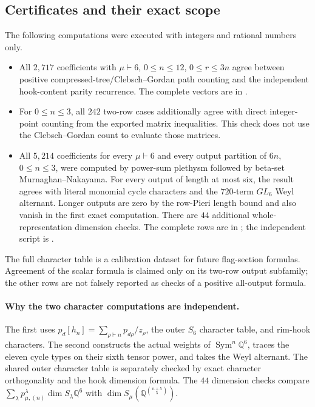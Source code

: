 \subsection{Certificates and their exact scope}
The following computations were executed with integers and
rational numbers only.
\begin{itemize}
\item All $2,717$ coefficients with $\mu\vdash6$,
$0\le n\le12$, $0\le r\le3n$ agree between positive
compressed-tree/Clebsch--Gordan path counting and the
independent hook-content parity recurrence.
The complete vectors are in
.
\item For $0\le n\le3$, all $242$ two-row cases additionally
agree with direct integer-point counting from the exported
matrix inequalities.  This check does not use the
Clebsch--Gordan count to evaluate those matrices.
\item All $5,214$ coefficients for every $\mu\vdash6$ and
every output partition of $6n$, $0\le n\le3$, were computed
by power-sum plethysm followed by beta-set
Murnaghan--Nakayama.  For every output of length at most six,
the result agrees with literal monomial cycle characters
and the $720$-term $GL_6$ Weyl alternant.  Longer outputs
are zero by the row-Pieri length bound and also vanish in
the first exact computation.  There are $44$ additional
whole-representation dimension checks.
The complete rows are in
; the independent
script is .
\end{itemize}
The full character table is a calibration dataset for
future flag-section formulas.  Agreement of the scalar
formula is claimed only on its two-row output subfamily;
the other rows are not falsely reported as checks of a
positive all-output formula.

\paragraph{Why the two character computations are independent.}
The first uses
$p_d[h_n]=\sum_{\rho\vdash n}p_{d\rho}/z_\rho$,
the outer $S_6$ character table, and rim-hook characters.
The second constructs the actual weights of
$\operatorname{Sym}^n\mathbb Q^6$, traces the eleven cycle
types on their sixth tensor power, and takes the Weyl
alternant.  The shared outer character table is separately
checked by exact character orthogonality and the hook
dimension formula.  The $44$ dimension checks compare
$\sum_\lambda p_{\mu,(n)}^\lambda\dim S_\lambda\mathbb Q^6$
with $\dim S_\mu(\mathbb Q^{\binom{n+5}{5}})$.

